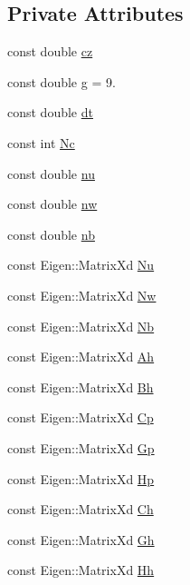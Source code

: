 \subsection*{Private Attributes}
\begin{DoxyCompactItemize}
\item 
const double \hyperlink{classZmpPreviewController_a3a317d26cc1bbaf8811491724fdd1def}{cz}
\item 
const double \hyperlink{classZmpPreviewController_a344571f012aa58250d7625905681bf1b}{g} = 9.
\item 
const double \hyperlink{classZmpPreviewController_abf1a3ec8d1698afab1c20bba32b5a724}{dt}
\item 
const int \hyperlink{classZmpPreviewController_af0c8b4aa92a6e3e95f80d81a8c91f693}{Nc}
\item 
const double \hyperlink{classZmpPreviewController_ac611f084023404faba1ccfab573cd81d}{nu}
\item 
const double \hyperlink{classZmpPreviewController_a783427b817d77469e1f80426bede5310}{nw}
\item 
const double \hyperlink{classZmpPreviewController_a6716ee4c94e6f91e608ee1e29fbc7051}{nb}
\item 
const Eigen\+::\+Matrix\+Xd \hyperlink{classZmpPreviewController_ac3e92145988993ede7ce2060b997c8db}{Nu}
\item 
const Eigen\+::\+Matrix\+Xd \hyperlink{classZmpPreviewController_a5e85354a1a7c3f2a8e265dbe7367051c}{Nw}
\item 
const Eigen\+::\+Matrix\+Xd \hyperlink{classZmpPreviewController_abd345d397e99ae01ad4ea80cd9894802}{Nb}
\item 
const Eigen\+::\+Matrix\+Xd \hyperlink{classZmpPreviewController_a8ee8ec415e25374f4fa687f5a5a6b9df}{Ah}
\item 
const Eigen\+::\+Matrix\+Xd \hyperlink{classZmpPreviewController_a98bd07d03d0a6004b345ef4310cf17b6}{Bh}
\item 
const Eigen\+::\+Matrix\+Xd \hyperlink{classZmpPreviewController_a1a63870dcc3d51a26c4adc9c97e650ff}{Cp}
\item 
const Eigen\+::\+Matrix\+Xd \hyperlink{classZmpPreviewController_a53a7d8af5be4a5d5cea99fad2ea48979}{Gp}
\item 
const Eigen\+::\+Matrix\+Xd \hyperlink{classZmpPreviewController_a32ab17a3be30490e4a1e874bf3581843}{Hp}
\item 
const Eigen\+::\+Matrix\+Xd \hyperlink{classZmpPreviewController_a2093754713ffb2a7adcd1310c73bf775}{Ch}
\item 
const Eigen\+::\+Matrix\+Xd \hyperlink{classZmpPreviewController_a9429cb06fdd2c3ca5036a2fd48303632}{Gh}
\item 
const Eigen\+::\+Matrix\+Xd \hyperlink{classZmpPreviewController_a8caaf8bf8f06e5b0b53d2cd5c131eefd}{Hh}
\end{DoxyCompactItemize}


